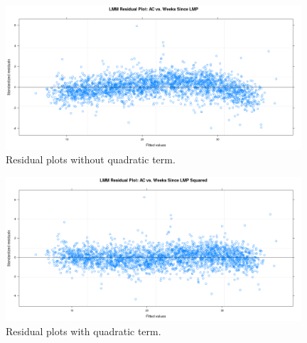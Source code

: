 \documentclass[12pt]{article}
\begin{document}
\begin{figure}[p]
  \centering
  \includegraphics[width=0.98\textwidth]{lmm-lin}
  \caption{Residual plots without quadratic term.}
  \label{fig:lmm-lin}
\end{figure}


\begin{figure}[p]
  \centering
  \includegraphics[width=0.98\textwidth]{lmm-qua}
  \caption{Residual plots with quadratic term.}
  \label{fig:lmm-qua}
\end{figure}
\end{document}
